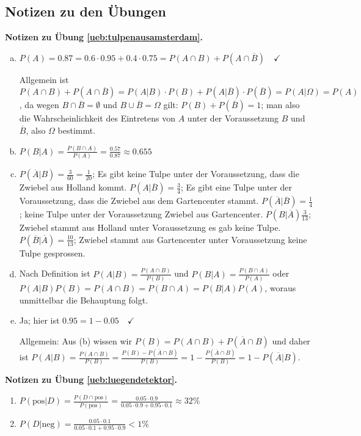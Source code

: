 \documentclass[%
11pt,%
twoside,%
titlepage,%
german,%
headsepline%
]{scrartcl}
\newcommand{\concatueb}[1]{ueb:#1}%
\newcommand{\concatlsg}[1]{lsg:#1}%
\newenvironment{lsg}[1]{%
    \par\noindent\textbf{Notizen zu Übung \ref{\concatueb{#1}}.}%
    \label{\concatlsg{#1}}
}{%
    \par%
}
\begin{document}
\clearpage

\subsection{Notizen zu den Übungen}

\begin{lsg}{tulpenausamsterdam}
    \begin{enumerate}[a)]
        \item $P(A)=0.87=0.6\cdot0.95+0.4\cdot0.75=P(A\cap B)+P(A\cap\overline{B})\quad\checkmark$
        
        Allgemein ist $P(A\cap B)+P(A\cap\overline{B})=P(A|B)\cdot P(B)+P(A|\overline{B})\cdot P(\overline{B})=P(A|\Omega)=P(A)$, da wegen $B\cap\overline{B}=\emptyset$ und $B\cup\overline{B}=\Omega$ gilt: $P(B)+P(\overline{B})=1$; man also die Wahrscheinlichkeit des Eintretens von $A$ unter der Voraussetzung $B$ und $\overline{B}$, also $\Omega$ bestimmt.
        \item $P(B|A)=\frac{P(B\cap A)}{P(A)}=\frac{0.57}{0.87}\approx0.655$
        \item $P(\overline{A}|B)=\frac{3}{60}=\frac{1}{20}$; Es gibt keine Tulpe unter der Voraussetzung, dass die Zwiebel aus Holland kommt. $P(A|\overline{B})=\frac{3}{4}$; Es gibt eine Tulpe unter der Voraussetzung, dass die Zwiebel aus dem Gartencenter stammt. $P(\overline{A}|\overline{B})=\frac{1}{4}$; keine Tulpe unter der Voraussetzung Zwiebel aus Gartencenter. $P(B|\overline{A})\frac{3}{13}$; Zwiebel stammt aus Holland unter Voraussetzung es gab keine Tulpe. $P(\overline{B}|\overline{A})=\frac{10}{13}$; Zwiebel stammt aus Gartencenter unter Voraussetzung keine Tulpe gesprossen.
        \item Nach Definition ist $P(A|B)=\frac{P(A\cap B)}{P(B)}$ und $P(B|A)=\frac{P(B\cap A)}{P(A)}$ oder $P(A|B)P(B)=P(A\cap B)=P(B\cap A)=P(B|A)P(A)$, woraus unmittelbar die Behauptung folgt.
        \item Ja; hier ist $0.95=1-0.05\quad\checkmark$
        
        Allgemein: Aus (b) wissen wir $P(B)=P(A\cap B)+P(\overline{A}\cap B)$ und daher ist $P(A|B)=\frac{P(A\cap B)}{P(B)}=\frac{P(B)-P(\overline{A}\cap B)}{P(B)}=1-\frac{P(\overline{A}\cap B)}{P(B)}=1-P(\overline{A}|B)$.
    \end{enumerate}
\end{lsg}
\begin{lsg}{luegendetektor}
    \begin{enumerate}
        \item $P(\text{pos}|D)=\frac{P(D\cap\text{pos})}{P(\text{pos})}=\frac{0.05\cdot 0.9}{0.05\cdot0.9+0.95\cdot0.1}\approx32\%$
        \item $P(D|\text{neg})=\frac{0.05\cdot0.1}{0.05\cdot0.1+0.95\cdot0.9}<1\%$
    \end{enumerate}
\end{lsg}
\end{document}

